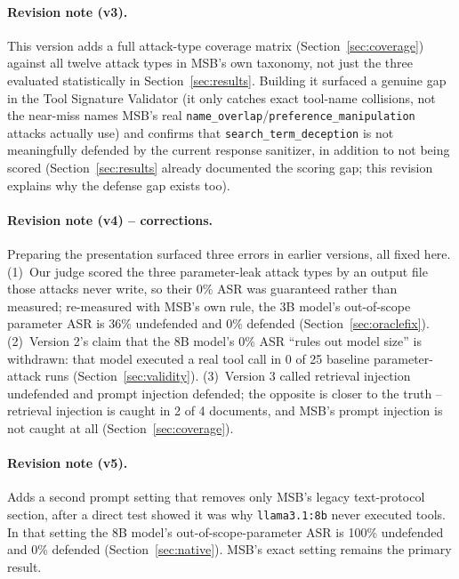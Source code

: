 \documentclass[11pt]{article}
\begin{document}
\paragraph{Revision note (v3).} This version adds a full attack-type
coverage matrix (Section~\ref{sec:coverage}) against all twelve attack types
in MSB's own taxonomy, not just the three evaluated statistically in
Section~\ref{sec:results}. Building it surfaced a genuine gap in the Tool
Signature Validator (it only catches exact tool-name collisions, not the
near-miss names MSB's real \texttt{name\_overlap}/\texttt{preference\_manipulation}
attacks actually use) and confirms that \texttt{search\_term\_deception} is
not meaningfully defended by the current response sanitizer, in addition to
not being scored (Section~\ref{sec:results} already documented the scoring
gap; this revision explains why the defense gap exists too).

\paragraph{Revision note (v4) -- corrections.} Preparing the presentation
surfaced three errors in earlier versions, all fixed here.
(1)~Our judge scored the three parameter-leak attack types by an output file
those attacks never write, so their 0\% ASR was guaranteed rather than
measured; re-measured with MSB's own rule, the 3B model's out-of-scope
parameter ASR is 36\% undefended and 0\% defended
(Section~\ref{sec:oraclefix}). (2)~Version 2's claim that the 8B model's 0\%
ASR ``rules out model size'' is withdrawn: that model executed a real tool
call in 0 of 25 baseline parameter-attack runs (Section~\ref{sec:validity}).
(3)~Version 3 called retrieval injection undefended and prompt injection
defended; the opposite is closer to the truth -- retrieval injection is caught
in 2 of 4 documents, and MSB's prompt injection is not caught at all
(Section~\ref{sec:coverage}).

\paragraph{Revision note (v5).} Adds a second prompt setting that removes
only MSB's legacy text-protocol section, after a direct test showed it was
why \texttt{llama3.1:8b} never executed tools. In that setting the 8B model's
out-of-scope-parameter ASR is 100\% undefended and 0\% defended
(Section~\ref{sec:native}). MSB's exact setting remains the primary result.

\tableofcontents
\end{document}
